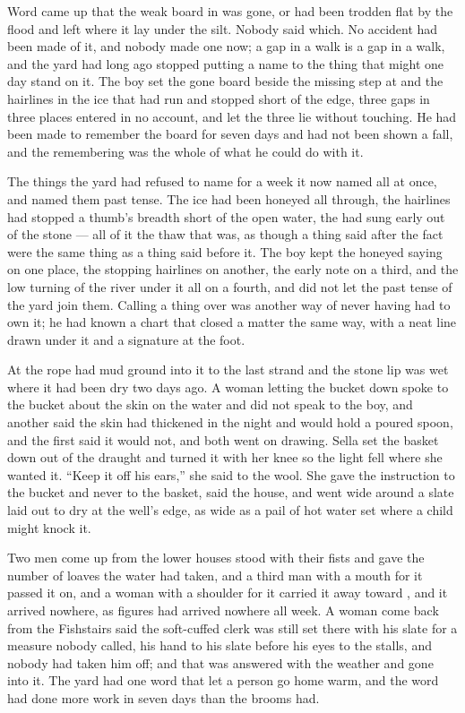 Word came up that the weak board in  was gone, or had been trodden flat by the flood and left where it lay under the silt. Nobody said which. No accident had been made of it, and nobody made one now; a gap in a walk is a gap in a walk, and the yard had long ago stopped putting a name to the thing that might one day stand on it. The boy set the gone board beside the missing step at  and the hairlines in the ice that had run and stopped short of the edge, three gaps in three places entered in no account, and let the three lie without touching. He had been made to remember the board for seven days and had not been shown a fall, and the remembering was the whole of what he could do with it.

The things the yard had refused to name for a week it now named all at once, and named them past tense. The ice had been honeyed all through, the hairlines had stopped a thumb's breadth short of the open water, the  had sung early out of the stone --- all of it the thaw that was, as though a thing said after the fact were the same thing as a thing said before it. The boy kept the honeyed saying on one place, the stopping hairlines on another, the early note on a third, and the low turning of the river under it all on a fourth, and did not let the past tense of the yard join them. Calling a thing over was another way of never having had to own it; he had known a chart that closed a matter the same way, with a neat line drawn under it and a signature at the foot.

\scenebreak

At  the rope had mud ground into it to the last strand and the stone lip was wet where it had been dry two days ago. A woman letting the bucket down spoke to the bucket about the skin on the water and did not speak to the boy, and another said the skin had thickened in the night and would hold a poured spoon, and the first said it would not, and both went on drawing. Sella set the basket down out of the draught and turned it with her knee so the light fell where she wanted it. “Keep it off his ears,” she said to the wool. She gave the instruction to the bucket and never to the basket, said the house, and went wide around a slate laid out to dry at the well's edge, as wide as a pail of hot water set where a child might knock it.

Two men come up from the lower houses stood with their fists and gave the number of loaves the water had taken, and a third man with a mouth for it passed it on, and a woman with a shoulder for it carried it away toward , and it arrived nowhere, as figures had arrived nowhere all week. A woman come back from the Fishstairs said the soft-cuffed clerk was still set there with his slate for a measure nobody called, his hand to his slate before his eyes to the stalls, and nobody had taken him off; and that was answered with the weather and gone into it. The yard had one word that let a person go home warm, and the word had done more work in seven days than the brooms had.

